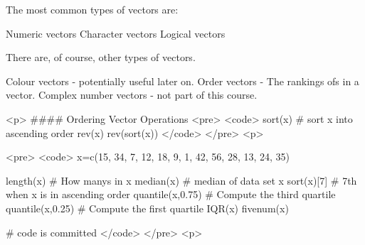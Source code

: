 The most common types of vectors are:

Numeric vectors Character vectors Logical
vectors


There are, of course, other types of vectors.

Colour vectors - potentially useful later on.
Order vectors - The rankings ofs in a vector.
Complex number vectors - not part of this course.


<p>
#### {Ordering Vector Operations}
<pre>
<code>
sort(x)  # sort x into ascending order
rev(x)
rev(sort(x))
</code>
</pre>
<p>

<pre>
<code>
x=c(15, 34, 7, 12, 18, 9, 1, 42, 56, 28, 13, 24, 35)

length(x)  # How manys in x
median(x)  # median of data set x
sort(x)[7] # 7th when x is in ascending order
quantile(x,0.75)  # Compute the third quartile
quantile(x,0.25)  # Compute the first quartile
IQR(x)     
fivenum(x)

# code is committed
</code>
</pre>
<p>
